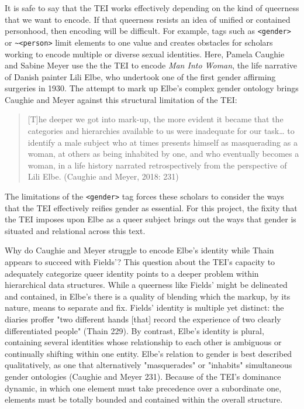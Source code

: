 \documentclass[11pt]{article}
\begin{document}
It is safe to say that the TEI works effectively depending on the kind
of queerness that we want to encode. If that queerness resists an idea
of unified or contained personhood, then encoding will be
difficult. For example, tags such as \texttt{<gender>} or \texttt{\textasciitilde{}<person>} limit
elements to one value and creates obstacles for scholars working to
encode multiple or diverse sexual identities. Here, Pamela Caughie and
Sabine Meyer use the the TEI to encode \emph{Man Into Woman}, the life
narrative of Danish painter Lili Elbe, who undertook one of the first
gender affirming surgeries in 1930. The attempt to mark up Elbe's
complex gender ontology brings Caughie and Meyer against this
structural limitation of the TEI:
\begin{quote}
[T]he deeper we got into mark-up, the more evident it became that the
categories and hierarchies available to us were inadequate for our
task\ldots{} to identify a male subject who at times presents himself as
masquerading as a woman, at others as being inhabited by one, and who
eventually becomes a woman, in a life history narrated retrospectively
from the perspective of Lili Elbe. (Caughie and Meyer, 2018: 231)
\end{quote}
The limitations of the \texttt{<gender>} tag forces these scholars to
consider the ways that the TEI effectively reifies gender as
essential. For this project, the fixity that the TEI imposes upon Elbe
as a queer subject brings out the ways that gender is situated and
relational across this text. 

Why do Caughie and Meyer struggle to encode Elbe's identity while
Thain appears to succeed with Fields'? This question about the TEI's
capacity to adequately categorize queer identity points to a deeper
problem within hierarchical data structures. While a queerness like
Fields' might be delineated and contained, in Elbe's there is a
quality of blending which the markup, by its nature, means to separate
and fix. Fields' identity is multiple yet distinct: the diaries
proffer "two different hands [that] record the experience of two
clearly differentiated people" (Thain 229). By contrast, Elbe's
identity is plural, containing several identities whose relationship
to each other is ambiguous or continually shifting within one
entity. Elbe's relation to gender is best described qualitatively, as
one that alternatively "masquerades" or "inhabits" simultaneous gender
ontologies (Caughie and Meyer 231). Because of the TEI's dominance
dynamic, in which one element must take precedence over a subordinate
one, elements must be totally bounded and contained within the overall
structure.
\end{document}
